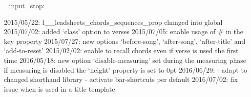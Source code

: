 \file_input_stop:

2015/05/22: \l__leadsheets_chords_sequences_prop changed into global
2015/07/02: added `class' option to verses
2015/07/05: enable usage of # in the key property
2015/07/27: new options `before-song', `after-song', `after-title' and
            `add-to-reset'
2015/02/02: enable to recall chords even if verse is used the first time
2016/05/18: new option `disable-measuring'
            set \@fileswfalse during the measuring phase
            if measuring is disabled the `height' property is set to 0pt
2016/06/29: - adapt to changed shorthand library
            - activate bar-shortcuts per default
2016/07/02: fix issue when \capo is used in a title template
